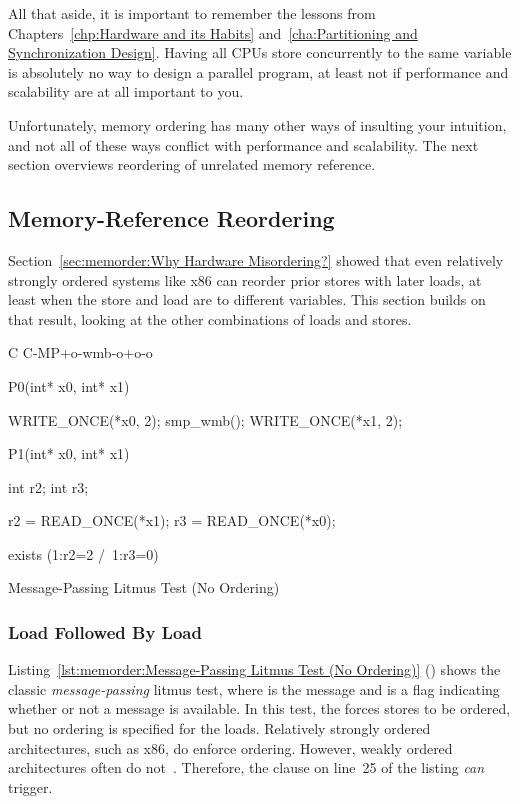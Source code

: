 All that aside, it is important to remember the lessons from
Chapters~\ref{chp:Hardware and its Habits}
and~\ref{cha:Partitioning and Synchronization Design}.
Having all CPUs store concurrently to the same variable
is absolutely no way to design a parallel program, at least
not if performance and scalability are at all important to you.

Unfortunately, memory ordering has many other ways of insulting your
intuition, and not all of these ways conflict with performance and
scalability.
The next section overviews reordering of unrelated memory reference.

\subsection{Memory-Reference Reordering}
\label{sec:memorder:Memory-Reference Reordering}

Section~\ref{sec:memorder:Why Hardware Misordering?}
showed that even relatively strongly ordered systems like x86
can reorder prior stores with later loads, at least when the
store and load are to different variables.
This section builds on that result, looking at the other combinations of
loads and stores.

\begin{listing}[tbp]
{ \scriptsize
\begin{verbbox}[\LstLineNo]
C C-MP+o-wmb-o+o-o

{
}


P0(int* x0, int* x1) {

  WRITE_ONCE(*x0, 2);
  smp_wmb();
  WRITE_ONCE(*x1, 2);

}

P1(int* x0, int* x1) {

  int r2;
  int r3;

  r2 = READ_ONCE(*x1);
  r3 = READ_ONCE(*x0);

}

exists (1:r2=2 /\ 1:r3=0)
\end{verbbox}
}
\centering
\theverbbox
\caption{Message-Passing Litmus Test (No Ordering)}
\label{lst:memorder:Message-Passing Litmus Test (No Ordering)}
\end{listing}

\subsubsection{Load Followed By Load}
\label{sec:memorder:Load Followed By Load}

Listing~\ref{lst:memorder:Message-Passing Litmus Test (No Ordering)}
()
shows the classic \emph{message-passing} litmus test, where  is
the message and  is a flag indicating whether or not a message
is available.
In this test, the  forces  stores to be ordered,
but no ordering is specified for the loads.
Relatively strongly ordered architectures, such as x86, do enforce ordering.
However, weakly ordered architectures often do
not~\cite{JadeAlglave2011ppcmem}.
Therefore, the  clause on line~25 of the listing \emph{can}
trigger.

